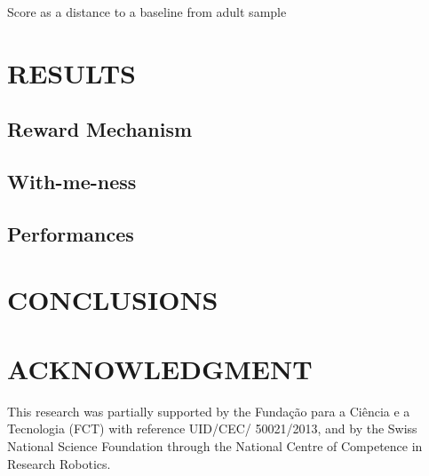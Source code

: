 \documentclass[letterpaper, 10 pt, conference]{ieeeconf}  %
\begin{document}
Score as a distance to a baseline from adult sample

\section{RESULTS}

\subsection{Reward Mechanism}
 


\subsection{With-me-ness}


\subsection{Performances}


\section{CONCLUSIONS}



\addtolength{\textheight}{-12cm}   %








\section*{ACKNOWLEDGMENT}
This research was partially supported by the Funda\c{c}\~{a}o para a Ci\^{e}ncia
e a Tecnologia (FCT) with reference UID/CEC/ 50021/2013, and by the Swiss
National Science Foundation through the National Centre of Competence in
Research Robotics.









\end{document}
